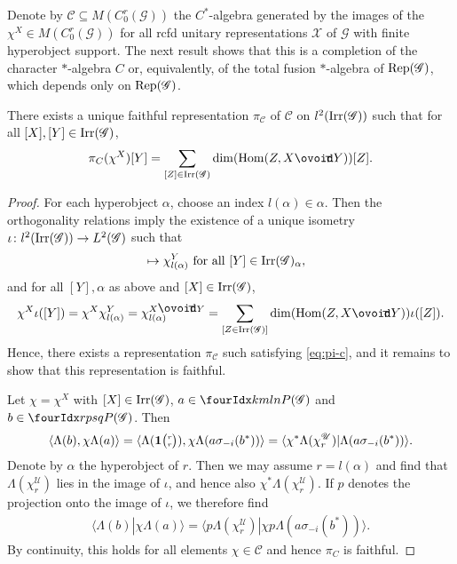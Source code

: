 Denote by $\mathcal{C} \subseteq M(C_{0}^{r}(\mathscr{G}))$ the
$C^{*}$-algebra generated by the images of the $\chi^{X} \in
M(C_{0}^{r}(\mathscr{G}))$ for all rcfd unitary representations
$\mathscr{X}$ of $\mathscr{G}$ with finite hyperobject support. The
next result shows that this is a completion of the character
$*$-algebra $C$ or, equivalently, of the total fusion $*$-algebra of
$\mathrm{Rep}(\mathscr{G})$, which depends only on $\mathrm{Rep}(\mathscr{G})$.
\begin{Prop}
  There exists a unique faithful representation $\pi_{\mathcal{C}}$ of
  $\mathcal{C}$ on $l^{2}(\mathrm{Irr}(\mathscr{G}))$ such that for all
  $[X],[Y] \in \mathrm{Irr}(\mathscr{G})$,
  \begin{align} \label{eq:pi-c}
    \pi_{C}(\chi^{X})[Y] = \sum_{[Z] \in \Irr(\mathscr{G})}
    \dim(\Hom(Z,X\Circt Y))[Z].
  \end{align}
\end{Prop}
\begin{proof}
  For each hyperobject $\alpha$, choose an index $l(\alpha) \in
  \alpha$. Then the orthogonality relations \cite[Corollary
2.23]{DCT1} imply the existence of a unique isometry $\iota\colon
  l^{2}(\mathrm{Irr}(\mathscr{G})) \to L^{2}(\mathscr{G})$ such that
\begin{align*}
  [Y] &\mapsto \chi^{Y}_{l(\alpha)} \text{ for all } [Y] \in
  \Irr(\mathscr{G})_{\alpha},
\end{align*}
 and for all $[Y],\alpha$ as above and $[X] \in
\mathrm{Irr}(\mathscr{G})$,
\begin{align*}
  \chi^{X}\iota([Y]) = \chi^{X}\chi^{Y}_{l(\alpha)} = \chi^{X \Circt
    Y}_{l(\alpha)} =  \sum_{[Z \in \Irr(\mathscr{G})]}
  \dim(\Hom(Z,X\Circt Y)) \iota([Z]).
\end{align*}
Hence,   there   exists  a representation $\pi_{\mathcal{C}}$ such
satisfying \eqref{eq:pi-c}, and it remains to show that this
representation is faithful. 

Let $\chi = \chi^X$ with $[X] \in \mathrm{Irr}(\mathscr{G})$, $a\in
\Gr{P(\mathscr{G})}{k}{l}{m}{n}$ and $b\in
\Gr{P(\mathscr{G})}{r}{s}{p}{q}$. Then
\begin{align*}
  \langle
\Lambda(b),\chi \Lambda(a)\rangle = \langle \Lambda(
\mathbf{1}{\tiny {\begin{pmatrix} r\\r\end{pmatrix}}}),\chi \Lambda(a\sigma_{-i}(b^*))\rangle  =
 \langle \chi^{*} \Lambda(\chi^{\mathscr{U}}_{r})  |
 \Lambda(a\sigma_{-i}(b^*))\rangle.
\end{align*}
Denote by $\alpha$ the hyperobject of $r$. Then we may assume
$r=l(\alpha)$ and find that $\Lambda(\chi^{\mathscr{U}}_{r})$ lies in
the image of $\iota$, and hence also $\chi^{*}
\Lambda(\chi^{\mathscr{U}}_{r})$. If $p$ denotes the projection onto
the image of $\iota$, we therefore find
\begin{align*}
  \langle
\Lambda(b) | \chi \Lambda(a)\rangle = 
 \langle p \Lambda(\chi^{\mathscr{U}}_{r})  | \chi
p \Lambda(a\sigma_{-i}(b^*))\rangle.
\end{align*}
By continuity, this holds for all elements $\chi \in \mathcal{C}$ and hence $\pi_{C}$ is faithful.
\end{proof}


